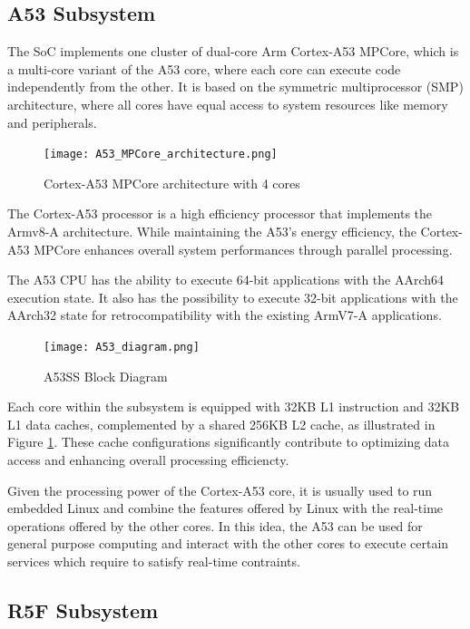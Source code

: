 \subsection{A53 Subsystem}

The SoC implements one cluster of dual-core Arm Cortex-A53 MPCore, which is
a multi-core variant of the A53 core, where each core can execute code 
independently from the other.
It is based on the symmetric multiprocessor (SMP) architecture, where all
cores have equal access to system resources like memory and peripherals.


\begin{figure}[htb]
    \centering
    \texttt{[image: A53\_MPCore\_architecture.png]}
    \caption{Cortex-A53 MPCore architecture with 4 cores}
\end{figure}

The Cortex-A53 processor is a high efficiency processor that implements the
Armv8-A architecture. While maintaining the A53's energy efficiency, the
Cortex-A53 MPCore enhances overall system performances through parallel
processing.

The A53 CPU has the ability to execute 64-bit applications with the AArch64
execution state. It also has the possibility to execute 32-bit applications
with the AArch32 state for retrocompatibility with the existing ArmV7-A
applications.

\begin{figure}[htb]
    \centering
    \texttt{[image: A53\_diagram.png]}
    \caption{A53SS Block Diagram}
    \label{fig:A53_diagram}
\end{figure}

Each core within the subsystem is equipped with 32KB L1 instruction and 32KB
L1 data caches, complemented by a shared 256KB L2 cache, as illustrated in
Figure \ref{fig:A53_diagram}. These cache configurations significantly
contribute to optimizing data access and enhancing overall processing
efficiencty.

Given the processing power of the Cortex-A53 core, it is usually used to run
embedded Linux and combine the features offered by Linux with the real-time
operations offered by the other cores.
In this idea, the A53 can be used for general purpose computing and interact
with the other cores to execute certain services which require to satisfy
real-time contraints.

\subsection{R5F Subsystem}


